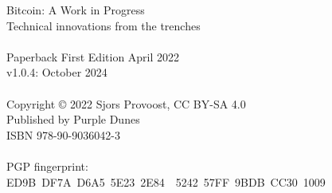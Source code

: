 \newpage
{\setlength{\parindent}{0cm}
\begin{vplace}
Bitcoin: A Work in Progress\\
Technical innovations from the trenches\\
\\
Paperback First Edition April 2022\\
v1.0.4: October 2024\\
\\
Copyright © 2022 Sjors Provoost, CC BY-SA 4.0\\
Published by Purple Dunes\\
ISBN 978-90-9036042-3\\


\\

PGP fingerprint:\\
ED9B DF7A D6A5 5E23 2E84  5242 57FF 9BDB CC30 1009\\

\end{vplace}
}
